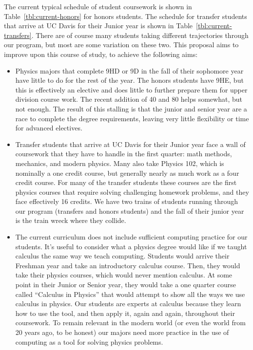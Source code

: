 \documentclass[12pt]{article}
\begin{document}
The current typical schedule of student coursework is shown in Table~\ref{tbl:current-honors} for honors students.  The schedule for transfer students that arrive at UC Davis for their Junior year is shown in Table~\ref{tbl:current-transfers}.  There are of course many students taking different trajectories through our program, but most are some variation on these two.  This proposal aims to improve upon this course of study, to achieve the following aims:
\begin{itemize}

\item Physics majors that complete 9HD or 9D in the fall of their sophomore year have little to do for the rest of the year.  The honors students have 9HE, but this is effectively an elective and does little to further prepare them for upper division course work.  The recent addition of 40 and 80 helps somewhat, but not enough.  The result of this stalling is that the junior and senior year are a race to complete the degree requirements, leaving very little flexibility or time for advanced electives.

\item Transfer students that arrive at UC Davis for their Junior year face a wall of coursework that they have to handle in the first quarter: math methods, mechanics, and modern physics.  Many also take Physics 102, which is nominally a one credit course, but generally nearly as much work as a four credit course.  For many of the transfer students these courses are the first physics courses that require solving challenging homework problems, and they face effectively 16 credits.  We have two trains of students running through our program (transfers and honors students) and the fall of their junior year is the train wreck where they collide.

\item The current curriculum does not include sufficient computing practice for our students.  It's useful to consider what a physics degree would like if we taught calculus the same way we teach computing.  Students would arrive their Freshman year and take an introductory calculus course.  Then, they would take their physics courses, which would never mention calculus.  At some point in their Junior or Senior year, they would take a one quarter course called ``Calculus in Physics'' that would attempt to show all the ways we use calculus in physics.  Our students are experts at calculus because they learn how to use the tool, and then apply it, again and again, throughout their coursework.  To remain relevant in the modern world (or even the world from 20 years ago, to be honest) our majors need more practice in the use of computing as a tool for solving physics problems.


\end{itemize}
\end{document}
